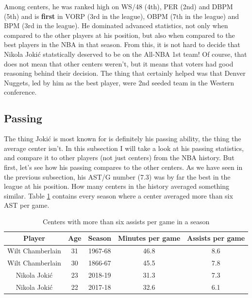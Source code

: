 \documentclass[a4paper]{article}
\begin{document}
Among centers, he was ranked high on WS/48 (4th), PER (2nd) and DBPM (5th) and is \textbf{first} in VORP (3rd in the league), OBPM (7th in the league) and BPM (3rd in the league). He dominated advanced statistics, not only when compared to the other players at his position, but also when compared to the best players in the NBA in that season. From this, it is not hard to decide that Nikola Joki\' c statstically deserved to be on the All-NBA 1st team! Of course, that does not mean that other centers weren't, but it means that voters had good reasoning behind their decision. The thing that certainly helped was that Denver Nuggets, led by him as the best player, were 2nd seeded team in the Western conference.

\subsection{Passing}
\label{subsec:jokic_passing}

The thing Joki\' c is most known for is definitely his passing ability, the thing the average center isn't. In this subsection I will take a look at his passing statistics, and compare it to other players (not just centers) from the NBA history. But first, let's see how his passing compares to the other centers. As we have seen in the previous subsection, his AST/G number (7.3) was by far the best in the league at his position. How many centers in the history averaged something similar. Table \ref{tab:centers_ast_g} contains every season where a center averaged more than  six AST per game. 

\begin{table}[h!]
\begin{center}
\begin{tabular}{|c|c|c|c|c|} \hline
\textbf{Player} & \textbf{Age} & \textbf{Season} & \textbf{Minutes per game} & \textbf{Assists per game} \\ \hline
Wilt Chamberlain & 31 & 1967-68 & 46.8 & 8.6 \\ \hline
Wilt Chamberlain & 30 & 1866-67 & 45.5 & 7.8\\ \hline
Nikola Jokić & 23 & 2018-19 & 31.3 & 7.3 \\ \hline
Nikola Jokić & 22 & 2017-18 & 32.6 & 6.1 \\ \hline
\end{tabular}
\caption{Centers with more than six assists per game in a season}
\label{tab:centers_ast_g}
\end{center}
\end{table}
\end{document}
